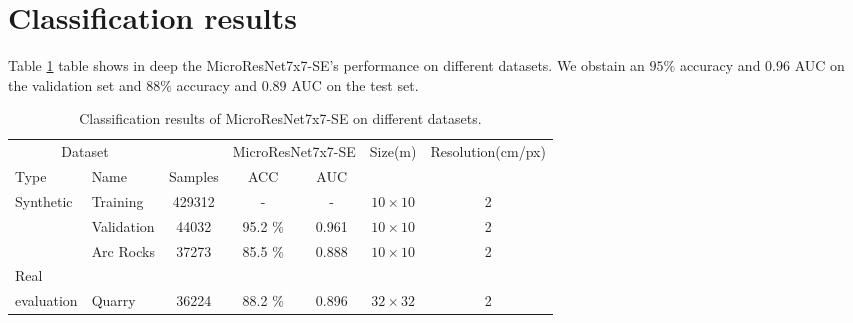 \documentclass[../document.tex]{subfiles}
\begin{document}
\section{Classification results}
Table \ref{tab : classification-results} table shows in deep the  MicroResNet7x7-SE's performance on different datasets. We obstain an $95\%$ accuracy and $0.96$ AUC on the validation set and $88\%$ accuracy and $0.89$ AUC on the test set.
\begin{table}[htbp]
    \centering
    \begin{tabular}{@{}llccccc@{}}
    \toprule
    \multicolumn{2}{c}{Dataset} && \multicolumn{2}{c}{MicroResNet7x7-SE} & Size(m) & Resolution(cm/px) \\
    \cmidrule{1-2} \cmidrule{4-5}
    Type     &  Name  & Samples & ACC  &  AUC    & & \\
    \toprule
      \multirow{3}{*}{Synthetic}  & Training   & 429312 & - & - & $10\times10$ & 2\\
      &  Validation   & 44032 &  95.2 \% &  0.961 & $10\times10$ & 2 \\
      & Arc Rocks & 37273 &  85.5 \% &  0.888 & $10\times10$ & 2 \\
      \cmidrule{2-7}
    Real\\evaluation & Quarry & 36224 &  88.2 \%&  0.896& $32\times32$ & 2\\
    \bottomrule   
\end{tabular}
\caption{Classification results of MicroResNet7x7-SE on different datasets.}
\label{tab : classification-results}
\end{table}
\end{document}
